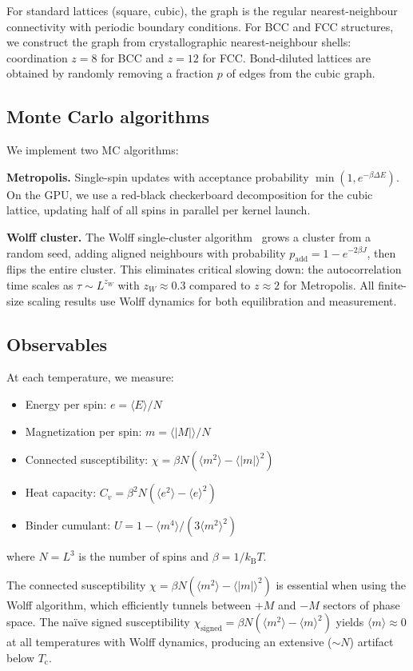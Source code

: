 \documentclass[twocolumn,showpacs,preprintnumbers,amsmath,amssymb,pra,floatfix]{revtex4-2}
\newcommand{\Tc}{T_{\mathrm{c}}}
\newcommand{\kB}{k_{\mathrm{B}}}
\newcommand{\avg}[1]{\langle #1 \rangle}
\begin{document}
For standard lattices (square, cubic), the graph is the regular nearest-neighbour
connectivity with periodic boundary conditions. For BCC and FCC structures, we
construct the graph from crystallographic nearest-neighbour shells: coordination
$z = 8$ for BCC and $z = 12$ for FCC. Bond-diluted lattices are obtained by
randomly removing a fraction $p$ of edges from the cubic graph.

\subsection{Monte Carlo algorithms}

We implement two MC algorithms:

\textbf{Metropolis.} Single-spin updates with acceptance probability
$\min(1, e^{-\beta \Delta E})$. On the GPU, we use a red-black checkerboard
decomposition for the cubic lattice, updating half of all spins in parallel
per kernel launch.

\textbf{Wolff cluster.} The Wolff single-cluster algorithm~\cite{Wolff1989} grows
a cluster from a random seed, adding aligned neighbours with probability
$p_{\mathrm{add}} = 1 - e^{-2\beta J}$, then flips the entire cluster. This
eliminates critical slowing down: the autocorrelation time scales as
$\tau \sim L^{z_W}$ with $z_W \approx 0.3$ compared to $z \approx 2$ for
Metropolis. All finite-size scaling results use Wolff dynamics for both
equilibration and measurement.

\subsection{Observables}

At each temperature, we measure:
\begin{itemize}
\item Energy per spin: $e = \avg{E}/N$
\item Magnetization per spin: $m = \avg{|M|}/N$
\item Connected susceptibility: $\chi = \beta N (\avg{m^2} - \avg{|m|}^2)$
\item Heat capacity: $C_v = \beta^2 N (\avg{e^2} - \avg{e}^2)$
\item Binder cumulant: $U = 1 - \avg{m^4}/(3\avg{m^2}^2)$
\end{itemize}
where $N = L^3$ is the number of spins and $\beta = 1/\kB T$.

The connected susceptibility $\chi = \beta N(\avg{m^2} - \avg{|m|}^2)$ is essential
when using the Wolff algorithm, which efficiently tunnels between $+M$ and $-M$
sectors of phase space. The na\"ive signed susceptibility
$\chi_{\mathrm{signed}} = \beta N(\avg{m^2} - \avg{m}^2)$ yields
$\avg{m} \approx 0$ at all temperatures with Wolff dynamics, producing an
extensive ($\sim N$) artifact below $\Tc$.
\end{document}
